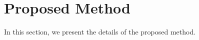 \documentclass[sigchi,authordraft]{acmart}
\begin{document}


\section{Proposed Method}
\label{sec:method}
In this section, we present the details of the proposed method.



\end{document}
